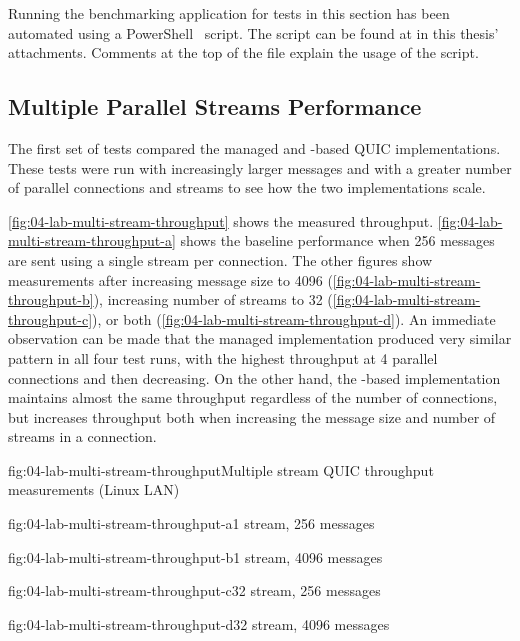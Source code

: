 Running the benchmarking application for tests in this section has been automated using a
PowerShell~\cite{powershell} script. The script can be found at
 in this thesis' attachments. Comments
at the top of the file explain the usage of the script.

\subsection{Multiple Parallel Streams Performance}\label{sec:04-multi-stream-perf}

The first set of tests compared the managed and \libmsquic{}-based QUIC implementations. These tests
were run with increasingly larger messages and with a greater number of parallel connections and
streams to see how the two implementations scale.

\autoref{fig:04-lab-multi-stream-throughput} shows the measured throughput.
\autoref{fig:04-lab-multi-stream-throughput-a} shows the baseline performance when \SI{256}{\byte}
messages are sent using a single stream per connection. The other figures show measurements after
increasing message size to \SI{4096}{\byte} (\autoref{fig:04-lab-multi-stream-throughput-b}),
increasing number of streams to 32 (\autoref{fig:04-lab-multi-stream-throughput-c}), or both
(\autoref{fig:04-lab-multi-stream-throughput-d}). An immediate observation can be made that the
managed implementation produced very similar pattern in all four test runs, with the highest
throughput at 4 parallel connections and then decreasing. On the other hand, the \libmsquic{}-based
implementation maintains almost the same throughput regardless of the number of connections, but
increases throughput both when increasing the message size and number of streams in a connection.

\begin{myFigure}{fig:04-lab-multi-stream-throughput}{Multiple stream QUIC throughput measurements (Linux LAN)}
\begin{mySubfigure}{0.49\linewidth}{fig:04-lab-multi-stream-throughput-a}{1 stream, \SI{256}{\byte} messages}
\footnotesize

\end{mySubfigure}
\begin{mySubfigure}{0.49\linewidth}{fig:04-lab-multi-stream-throughput-b}{1 stream, \SI{4096}{\byte} messages}
\footnotesize

\end{mySubfigure}

\begin{mySubfigure}{0.49\linewidth}{fig:04-lab-multi-stream-throughput-c}{32 stream, \SI{256}{\byte} messages}
\footnotesize

\end{mySubfigure}
\begin{mySubfigure}{0.49\linewidth}{fig:04-lab-multi-stream-throughput-d}{32 stream, \SI{4096}{\byte} messages}
\footnotesize

\end{mySubfigure}
\end{myFigure}

